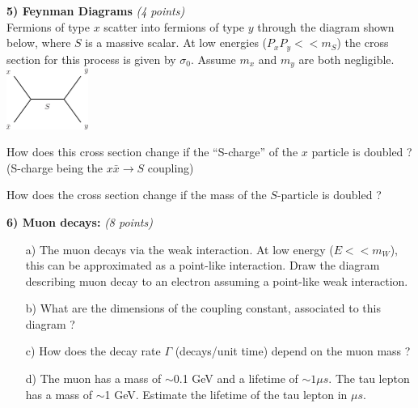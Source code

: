 {\textbf{5) Feynman Diagrams }\hfill \textit{(4 points)}\\
Fermions of type $x$ scatter into fermions of type $y$ through the diagram shown below, where $S$ is a massive scalar. 
At low energies ($P_x P_y << m_S$) the cross section for this process is given by $\sigma_0$.
Assume $m_x$ and $m_y$ are both negligible.
\bc
\includegraphics[width=0.2\textwidth]{./xxToyy.pdf}
\ec
\bi
\item[a)] How does this cross section change if the ``S-charge'' of the $x$ particle is doubled ? \\ (S-charge being the $x\bar{x} \rightarrow S$ coupling) 
\vspace*{1.0in}
\item[b)] How does the cross section change if the mass of the $S$-particle is doubled ?
\vspace*{1.0in}
\ei

\clearpage

\textbf{6) Muon decays: } \hfill \textit{(8 points)}\\
\begin{itemize}
  \item[a)]{ The muon decays via the weak interaction.  At low energy ($E << m_W$), this can be approximated as a point-like interaction. 
  Draw the diagram describing muon decay to an electron assuming a point-like weak interaction. 
  \vspace*{1.5in}
}
  \item[b)]{What are the dimensions of the coupling constant, associated to this diagram  ?
\vspace*{1.5in}
  }
  \item[c)] How does the decay rate $\Gamma$ (decays/unit time)  depend on the muon mass ? 
\vspace*{1.5in}
  \item[d)]{ The muon has a mass of $\sim$0.1 GeV and a lifetime of $\sim 1 \mu s$. The tau lepton has a mass of {$\sim$1 GeV}. Estimate the lifetime of the tau lepton in $\mu s$.
\vspace*{1.5in}
}
\end{itemize}

\clearpage


}
